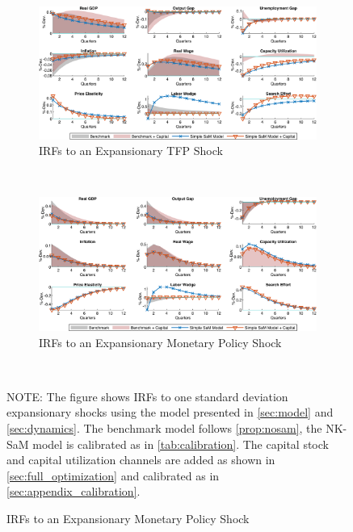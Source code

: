 \documentclass[12pt,3p,authoryear,review]{elsarticle}
\begin{document}
\begin{figure}%
    \centering%
    \caption{Adding Capital (Utilization) - IRFs to Expansionary TFP and Demand Shocks}\label{fig:app_irf_robust_capital_1}%
    \begin{subfigure}{\textwidth}%
        \centering%
        \caption{IRFs to an Expansionary TFP Shock}%
        \includegraphics[width=\textwidth]{fig_33_irf_robust_capital_tfp.png}%
    \end{subfigure}\\%
	\vspace{0.2in}%
    \begin{subfigure}{\textwidth}%
        \centering%
        \caption{IRFs to an Expansionary Monetary Policy Shock}%
        \includegraphics[width=\textwidth]{fig_34_irf_robust_capital_policy.png}%
    \end{subfigure}\\%
    {\tiny \singlespacing NOTE: The figure shows IRFs to one standard deviation expansionary shocks using the model presented in \cref{sec:model} and \cref{sec:dynamics}. The benchmark model follows \cref{prop:nosam}, the NK-SaM model is calibrated as in \cref{tab:calibration}. The capital stock and capital utilization channels are added as shown in \ref{sec:full_optimization} and calibrated as in \ref{sec:appendix_calibration}.\par}%
\end{figure}%
\end{document}
